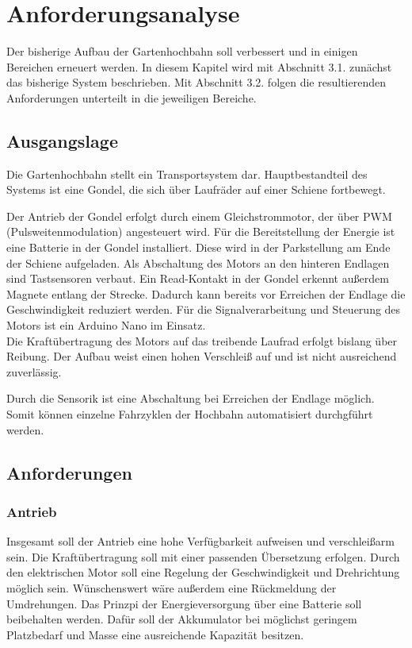 \chapter{Anforderungsanalyse}
Der bisherige Aufbau der Gartenhochbahn soll verbessert und in einigen Bereichen erneuert werden. 
In diesem Kapitel wird mit Abschnitt 3.1.%
 zunächst das bisherige System beschrieben. 
Mit Abschnitt 3.2. folgen die resultierenden Anforderungen unterteilt in die jeweiligen Bereiche.  

\section{Ausgangslage}
Die Gartenhochbahn stellt ein Transportsystem dar. Hauptbestandteil des Systems ist eine Gondel, die sich über Laufräder 
auf einer Schiene fortbewegt. 

Der Antrieb der Gondel erfolgt durch einem Gleichstrommotor, der über PWM (Pulsweitenmodulation) angesteuert wird. Für die Bereitstellung der Energie ist eine Batterie in der Gondel installiert. Diese wird in der Parkstellung am Ende der Schiene aufgeladen. Als Abschaltung des Motors an den hinteren Endlagen sind Tastsensoren verbaut. Ein Read-Kontakt in der Gondel erkennt außerdem Magnete entlang der Strecke. Dadurch kann bereits vor Erreichen der Endlage die Geschwindigkeit reduziert werden. Für die Signalverarbeitung und Steuerung des Motors ist ein Arduino Nano im Einsatz. \\

Die Kraftübertragung des Motors auf das treibende Laufrad erfolgt bislang über Reibung. Der Aufbau weist einen hohen Verschleiß auf und ist nicht ausreichend zuverlässig. 

Durch die Sensorik ist eine Abschaltung bei Erreichen der Endlage möglich. Somit können einzelne Fahrzyklen der Hochbahn automatisiert durchgführt werden. 



\section{Anforderungen}
\subsection{Antrieb}
Insgesamt soll der Antrieb eine hohe Verfügbarkeit aufweisen und verschleißarm sein. 
Die Kraftübertragung soll mit einer passenden Übersetzung erfolgen. Durch den elektrischen Motor soll eine Regelung der Geschwindigkeit und Drehrichtung möglich sein. Wünschenswert wäre außerdem eine Rückmeldung der Umdrehungen. 
Das Prinzpi der Energieversorgung über eine Batterie soll beibehalten werden. Dafür soll der Akkumulator bei möglichst geringem Platzbedarf und Masse eine ausreichende Kapazität besitzen. 

